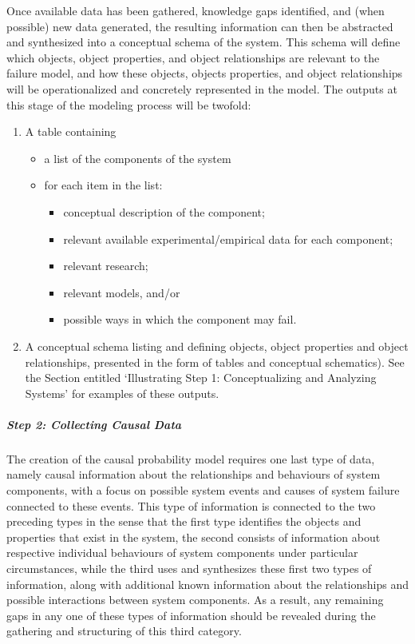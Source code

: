\newl Once available data has been gathered, knowledge gaps identified, and (when possible) new data generated, the resulting information can then be abstracted and synthesized into a conceptual schema of the system. This schema will define which objects, object properties, and object relationships are relevant to the failure model, and how these objects, objects properties, and object relationships will be operationalized and concretely represented in the model.
\newl The outputs at this stage of the modeling process will be twofold:
\begin{enumerate}[noitemsep]
\item A table containing
	\begin{itemize}[noitemsep]
	\item a list of the components of the system
	\item for each item in the list:
		\begin{itemize}[noitemsep]
		\item conceptual description of the component;
		\item relevant available experimental/empirical data for each component;
		\item relevant research;
		\item relevant models, and/or
		\item possible ways in which the component may fail.
		\end{itemize}
	\end{itemize}
\item A conceptual schema listing and defining objects, object properties and object relationships, presented in the form of tables and conceptual schematics). See the Section entitled `Illustrating Step 1: Conceptualizing and Analyzing Systems' for examples of these outputs.

\end{enumerate}
\subparagraph{Step 2: Collecting Causal Data}
\label{sec:methodstep2}
The creation of the causal probability model requires one last type of data, namely causal information about the relationships and behaviours of system components, with a focus on possible system events and causes of system failure connected to these events.
\newl
This type of information is connected to the two preceding types in the sense that the first type identifies the objects and properties that exist in the system, the second consists of information about respective individual behaviours of system components under particular circumstances, while the third uses and synthesizes these first two types of information, along with additional known information about the relationships and possible interactions between system components. As a result, any remaining gaps in any one of these types of information should be revealed during the gathering and structuring of this third category.
